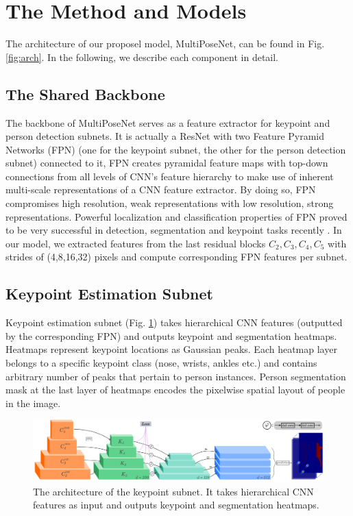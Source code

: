 \documentclass[runningheads]{llncs}
\begin{document}
\section{The Method and Models} 
The architecture of our proposel model, MultiPoseNet, can be found in Fig. \ref{fig:arch}. In the following, we describe each component in detail. 






\subsection{The Shared Backbone}
\label{sec:method-backbone}
The backbone of MultiPoseNet serves as  a feature extractor for keypoint and person detection subnets. It is actually a ResNet \cite{He2016} with two Feature Pyramid Networks (FPN)\cite{Lina} (one for the keypoint subnet, the other for the person detection subnet) connected to it, FPN creates pyramidal feature maps with top-down connections from all levels of CNN’s feature hierarchy to make use of inherent multi-scale representations of a CNN feature extractor. By doing so, FPN compromises high resolution, weak representations with low resolution, strong representations. Powerful localization and classification properties of FPN proved to be very successful in detection, segmentation and keypoint tasks recently \cite{Chen2017a, He2017a, Lin2017, Lina}. In our model, we extracted features from the last residual blocks $C_2, C_3, C_4, C_5$ with strides of (4,8,16,32) pixels and compute corresponding FPN features per subnet.
\subsection{Keypoint Estimation Subnet}
\label{sec:kp}
Keypoint estimation subnet (Fig. \ref{fig:kp-arch}) takes hierarchical CNN features (outputted by the corresponding FPN) and outputs keypoint and segmentation heatmaps. Heatmaps represent keypoint locations as Gaussian peaks. Each heatmap layer belongs to a specific keypoint class (nose, wrists, ankles etc.) and contains arbitrary number of peaks that pertain to person instances. Person segmentation mask at the last layer of heatmaps encodes the pixelwise spatial layout of people in the image.




\begin{figure}
\centering
\includegraphics[width=\textwidth]{Figures/kp-arch.pdf}
\caption{The architecture of the keypoint subnet. It takes hierarchical CNN features as input and outputs keypoint and segmentation heatmaps.}
\label{fig:kp-arch}
\end{figure}
\end{document}
